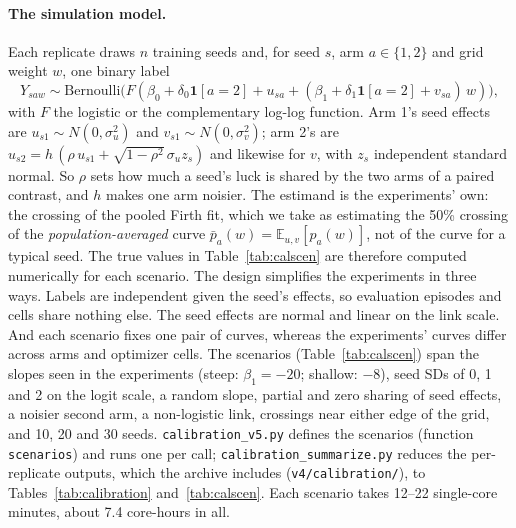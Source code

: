 \paragraph{The simulation model.}
Each replicate draws $n$ training seeds and, for seed $s$, arm $a\in\{1,2\}$ and grid weight $w$, one binary label
\begin{equation}
Y_{saw}\sim\mathrm{Bernoulli}\bigl(F(\beta_0+\delta_0\mathbf 1[a=2]+u_{sa}+(\beta_1+\delta_1\mathbf 1[a=2]+v_{sa})\,w)\bigr),
\label{eq:calmodel}
\end{equation}
with $F$ the logistic or the complementary log-log function. Arm 1's seed effects are $u_{s1}\sim N(0,\sigma_u^2)$ and
$v_{s1}\sim N(0,\sigma_v^2)$; arm 2's are $u_{s2}=h\,(\rho\,u_{s1}+\sqrt{1-\rho^2}\,\sigma_u z_s)$ and likewise for $v$,
with $z_s$ independent standard normal. So $\rho$ sets how much a seed's luck is shared by the two arms of a paired
contrast, and $h$ makes one arm noisier. The estimand is the experiments' own: the crossing of the pooled Firth
fit, which we take as estimating the 50\% crossing of the \emph{population-averaged} curve $\bar p_a(w)=\mathbb E_{u,v}[p_a(w)]$, not
of the curve for a typical seed. The true values in Table~\ref{tab:calscen} are therefore computed numerically for
each scenario. The design simplifies the experiments in three ways. Labels are independent given the seed's effects,
so evaluation episodes and cells share nothing else. The seed effects are normal and linear on the link scale. And
each scenario fixes one pair of curves, whereas the experiments' curves differ across arms and optimizer cells. The scenarios
(Table~\ref{tab:calscen}) span the slopes seen in the experiments (steep: $\beta_1=-20$; shallow: $-8$), seed SDs of 0, 1
and 2 on the logit scale, a random slope, partial and zero sharing of seed effects, a noisier second arm, a non-logistic
link, crossings near either edge of the grid, and 10, 20 and 30 seeds. \texttt{calibration\_v5.py} defines the scenarios
(function \texttt{scenarios}) and runs one per call; \texttt{calibration\_summarize.py} reduces the per-replicate
outputs, which the archive includes (\texttt{v4/calibration/}), to Tables~\ref{tab:calibration} and~\ref{tab:calscen}.
Each scenario takes 12--22 single-core minutes, about 7.4 core-hours in all.









